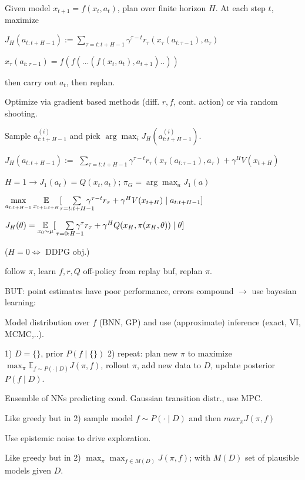 Given model $x_{t+1} = f(x_t, a_t)$, plan over finite horizon $H$.
At each step $t$, maximize

{$J_H(a_{t:t+H-1}) := \sum_{\tau = t:t+H-1} \gamma^{\tau - t} r_\tau(x_\tau(a_{t:\tau-1}), a_\tau)$}

$x_\tau(a_{t:\tau-1}) = f(f(...(f(x_t, a_t), a_{t+1})..))$

then carry out $a_t$, then replan.

Optimize via gradient based methods (diff. $r, f$, cont. action) or via random shooting.

Sample $a_{t:t+H-1}^{(i)}$
and pick $\arg\max_i J_H(a_{t:t+H-1}^{(i)})$.

 $J_H(a_{t:t+H-1}) :=$
{$\sum_{\tau = t:t+H-1} \gamma^{\tau - t} r_\tau(x_\tau(a_{t:\tau-1}), a_\tau) + \gamma^H V(x_{t+H})$}

$H=1\rightarrow J_1(a_t) = Q(x_t, a_t)$; $\pi_G = \arg\max_a J_1(a)$


{\fontsize{9}{6}\selectfont $\max\limits_{a_{t:t+H-1}} \underset{x_{t+1:t+H}}{\mathbb{E}}
[ \hspace*{-1mm}\sum\limits_{\tau = t:t+H-1} \hspace*{-4mm} \gamma^{\tau - t} r_\tau + \gamma^H V(x_{t+H}) \mid a_{t:t+H-1} ]$}


$J_H(\theta) = \underset{x_0 \sim \mu}{\mathbb{E}} [ \sum\limits_{\tau = 0:H-1} \hspace*{-4mm} \gamma^{\tau} r_\tau + \gamma^H Q(x_{H}, \pi(x_H, \theta)) \mid \theta ]$

($H = 0 \Leftrightarrow$ DDPG obj.)

 follow $\pi$, learn $f, r, Q$ off-policy from replay buf, replan $\pi$.

BUT: point estimates have poor performance, errors compound $\rightarrow$ use bayesian learning:

Model distribution over $f$ (BNN, GP) and use (approximate) inference (exact, VI, MCMC,..).


1) $D=\{\}$, prior $P(f\mid\{\})$ 2) repeat: plan new $\pi$ to maximize
{$\max_\pi \mathbb{E}_{f \sim P(\cdot \mid D)} J(\pi, f)$}, rollout 
$\pi$, add new data to $D$, update posterior $P(f \mid D)$.

 Ensemble of NNs predicting cond. 
Gaussian transition distr., use MPC.

 Like greedy but in 2) sample model 
{$f \sim P(\cdot \mid D)$} and then {$max_\pi J(\pi, f)$}

Use epistemic noise to drive exploration.

 Like greedy
but in 2) {$\max_\pi \max_{f \in M(D)} J(\pi, f)$};
 with $M(D)$ set of plausible models given $D$.
